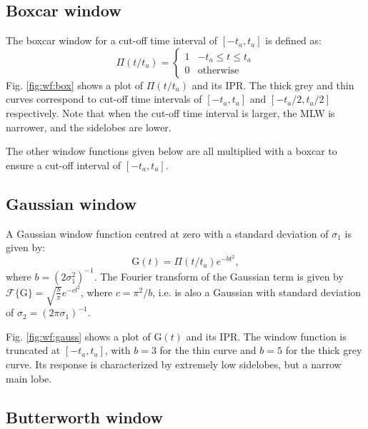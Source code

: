 \documentclass[useAMS,usenatbib]{mn2e}
\begin{document}
\subsection{Boxcar window}


The boxcar window for a cut-off time interval of $[-t_a,t_a]$ is defined as:
\begin{equation}
\Pi(t/t_a)=\left\{
\begin{array}{rl}
1 & \mbox{$-t_a \leq t \leq t_a$} \\
0 & \mbox{otherwise}
\end{array}\right.
\end{equation}
Fig. \ref{fig:wf:box} shows a plot of $\Pi(t/t_a)$ and its IPR. The thick grey and thin curves 
correspond to cut-off time intervals of $[-t_a, t_a]$ and 
$[-t_a/2,t_a/2]$ respectively. Note that when the cut-off time interval is larger, the MLW is 
narrower, and the sidelobes are lower.

The other window functions given below are all multiplied with a boxcar to ensure a cut-off interval of $[-t_a,t_a]$.

\subsection{Gaussian window}


A Gaussian window function centred at zero with a standard deviation of $\sigma_1$ is given by: 
\begin{equation}
\mathrm{G}(t)= \Pi(t/t_a) e^{-bt^{2}}, \label{eq:gauss}
\end{equation}
where $b=(2\sigma_1^2)^{-1}$. The Fourier transform of the Gaussian term is given by 
$\mathcal{F}\big\{\mathrm{G}\big\}=\sqrt{\frac{b}{\pi}}e^{-cl^2}$, where $c=\pi^2/b$, i.e.
is also a Gaussian with standard deviation of $\sigma_2= (2\pi\sigma_1)^{-1}$.

Fig. \ref{fig:wf:gauss} shows a plot of $\mathrm{G}(t)$ and its IPR. 
The window function is truncated at $[-t_a,t_a]$, with $b = 3$ for the thin curve and $b=5$ for the thick grey curve. 
Its response is characterized by extremely low sidelobes, but a narrow main lobe.

\subsection{Butterworth window}
\end{document}
